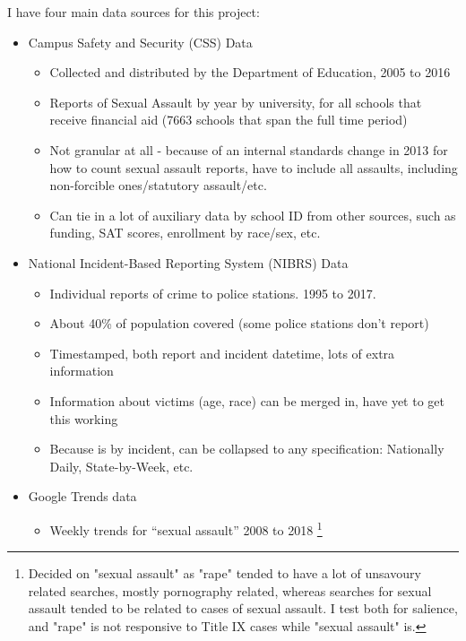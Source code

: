 \documentclass[AER]{AEA}
\begin{document}
I have four main data sources for this project: 
\begin{itemize}
    \item Campus Safety and Security (CSS) Data
    \begin{itemize}
        \item Collected and distributed by the Department of Education, 2005 to 2016
        \item Reports of Sexual Assault by year by university, for all schools that receive financial aid (7663 schools that span the full time period)
        \item Not granular at all - because of an internal standards change in 2013 for how to count sexual assault reports, have to include all assaults, including non-forcible ones/statutory assault/etc.
        \item Can tie in a lot of auxiliary data by school ID from other sources, such as funding, SAT scores, enrollment by race/sex, etc.
    \end{itemize}
    \item National Incident-Based Reporting System (NIBRS) Data
    \begin{itemize}
        \item Individual reports of crime to police stations. 1995 to 2017.
        \item About 40\% of population covered (some police stations don’t report)
        \item Timestamped, both report and incident datetime, lots of extra information
        \item Information about victims (age, race) can be merged in, have yet to get this working
        \item Because is by incident, can be collapsed to any specification: Nationally Daily, State-by-Week, etc. 
    \end{itemize}
    \item Google Trends data
    \begin{itemize}
        \item Weekly trends for “sexual assault” 2008 to 2018 \footnote{Decided on "sexual assault" as "rape" tended to have a lot of unsavoury related searches, mostly pornography related, whereas searches for sexual assault tended to be related to cases of sexual assault. I test both for salience, and "rape" is not responsive to Title IX cases while "sexual assault" is.} 

\end{itemize}
\end{itemize}
\end{document}
